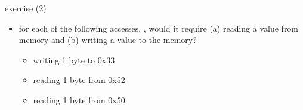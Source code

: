 \begin{frame}[fragile,label=writeReplaceEx2]{exercise (2)}
\begin{itemize}
\item
for each of the following accesses, , would it require (a) reading a value from memory and (b) writing a value to the memory?
    \begin{itemize}
    \item writing 1 byte to 0x33
    \item reading 1 byte from 0x52
    \item reading 1 byte from 0x50
    
    \end{itemize}
\end{itemize}
\end{frame}

